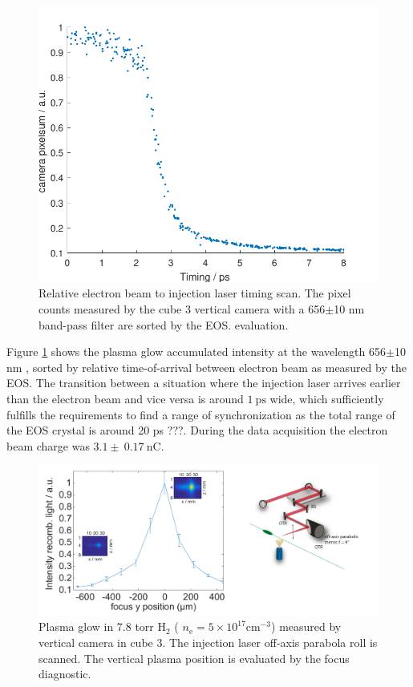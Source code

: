 \begin{figure}[htbp]
\center
\includegraphics[width=1\textwidth]{experiment/images/raw/PlasmaGlow_20384_scatter.pdf}
\caption{Relative electron beam to injection laser timing scan. The pixel counts measured by the cube 3 vertical camera with a 656$\pm$10 nm  band-pass filter are sorted by the EOS. evaluation.}
\label{img:PlasmaGlowTimingOAP_H2He}
\end{figure}

Figure \ref{img:PlasmaGlowTimingOAP_H2He} shows the plasma glow accumulated intensity at the wavelength 656$\pm$10 nm , sorted by relative time-of-arrival between electron beam as measured by the EOS. The transition between a situation where the injection laser arrives earlier than the electron beam and vice versa is around $1\ \mathrm{ps}$ wide, which sufficiently fulfills the requirements to find a range of synchronization as the total range of the EOS crystal is around 20 ps ???.
During the data acquisition the electron beam charge was $3.1\pm \ 0.17\ \mathrm{nC}$. 

\begin{figure}[htbp]
\center
\includegraphics[width=1.0\textwidth]{experiment/images/edited/Plasma_Glow_roll.pdf}
\caption{Plasma glow in 7.8 torr $\mathrm{H}_2$ ( $n_\mathrm{e}=5\times10^{17}\mathrm{cm}^{-3} $) measured by vertical camera in cube 3. The injection laser off-axis parabola roll is scanned. The vertical plasma position is evaluated by the focus diagnostic.}
\label{img:PlasmaGlowRoll}
\end{figure}
